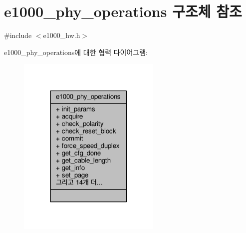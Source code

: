 \hypertarget{structe1000__phy__operations}{}\section{e1000\+\_\+phy\+\_\+operations 구조체 참조}
\label{structe1000__phy__operations}


{\ttfamily \#include $<$e1000\+\_\+hw.\+h$>$}



e1000\+\_\+phy\+\_\+operations에 대한 협력 다이어그램\+:
\nopagebreak
\begin{figure}[H]
\begin{center}
\leavevmode
\includegraphics[width=194pt]{structe1000__phy__operations__coll__graph}
\end{center}
\end{figure}
